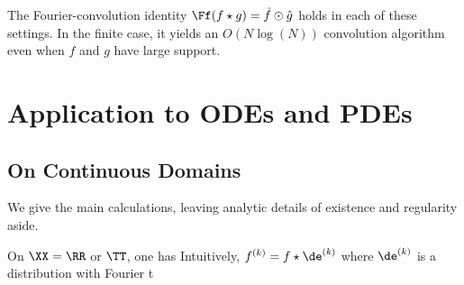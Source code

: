 The Fourier-convolution identity $\Ff(f \star g)=\hat f \odot \hat g$ holds in each of these settings. In the finite case, it yields an $O(N \log(N))$ convolution algorithm even when $f$ and $g$ have large support.


                                                
                                                
                                                
\section{Application to ODEs and PDEs}
\label{sec-fourier-pdes}

                                                
\subsection{On Continuous Domains}

We give the main calculations, leaving analytic details of existence and regularity aside.

On $\XX=\RR$ or $\TT$, one has
Intuitively, $f^{(k)} = f \star \de^{(k)}$ where $\de^{(k)}$ is a distribution with Fourier t